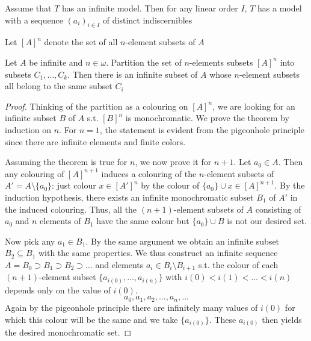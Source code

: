 \documentclass[11pt]{article}
\begin{document}

\begin{corollary}[]
Assume that \(T\) has an infinite model. Then for any linear order \(I\), \(T\) has a model with
a sequence \((a_i)_{i\in I}\) of distinct indiscernibles
\end{corollary}

Let \([A]^n\) denote the set of all \(n\)-element subsets of \(A\)

\begin{theorem}[Ramsey]
Let \(A\) be infinite and \(n\in\omega\). Partition the set of \(n\)-elements subsets \([A]^n\) into
subsets \(C_1,\dots,C_k\). Then there is an infinite subset of \(A\) whose \(n\)-element subsets all
belong to the same subset \(C_i\)
\end{theorem}

\begin{proof}
Thinking of the partition as a colouring on \([A]^n\), we are looking for an infinite
subset \(B\) of \(A\) s.t. \([B]^n\) is monochromatic. We prove the theorem by induction
on \(n\). For \(n=1\), the statement is evident from the pigeonhole principle since there are
infinite elements and finite colors.

Assuming the theorem is true for \(n\), we now prove it for \(n+1\). Let \(a_0\in A\). Then any
colouring of \([A]^{n+1}\) induces a colouring of the \(n\)-element subsets of \(A'=A\setminus\{a_0\}\):
just colour \(x\in[A']^n\) by the colour of \(\{a_0\}\cup x\in[A]^{n+1}\). By the induction hypothesis,
there exists an infinite monochromatic subset \(B_1\) of \(A'\) in the induced colouring. Thus,
all the \((n+1)\)-element subsets of \(A\) consisting of \(a_0\) and \(n\) elements of \(B_1\)
have the same colour but \(\{a_0\}\cup B\) is not our desired set.

Now pick any \(a_1\in B_1\). By the same argument we obtain an infinite
subset \(B_2\subseteq B_1\) with the same properties. We thus construct an infinite
sequence \(A=B_0\supset B_1\supset B_2\supset\dots\) and elements \(a_i\in B_i\setminus B_{i+1}\) s.t.
the colour of each \((n+1)\)-element subset \(\{a_{i(0)},\dots,a_{i(n)}\}\) with \(i(0)<i(1)<\dots<i(n)\)
depends only on the value of \(i(0)\).
\begin{equation*}
a_0,a_1,a_2,\dots,a_n,\dots
\end{equation*}
Again by the pigeonhole principle there are infinitely
many values of \(i(0)\) for which this colour will be the same and we take \(\{a_{i(0)}\}\).
These \(a_{i(0)}\) then yields
the desired monochromatic set.
\end{proof}
\end{document}
